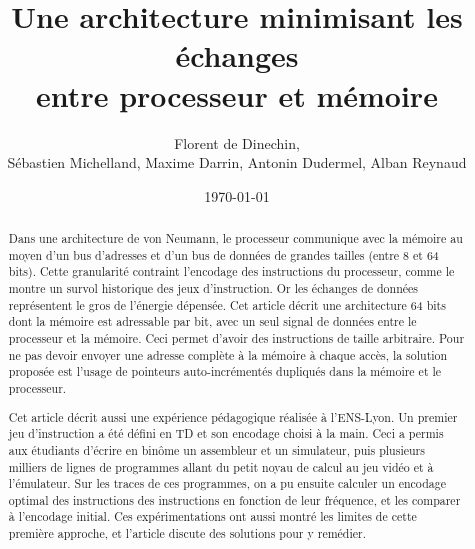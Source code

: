 \documentclass[architecture]{compas2018}
\begin{document}
\title{Une architecture minimisant les échanges\\ entre processeur et mémoire}

\author{Florent de Dinechin, \\Sébastien Michelland, Maxime Darrin, Antonin Dudermel, Alban Reynaud}

\address{
}

\date{\today}

\maketitle
\sloppy

\begin{abstract}
Dans une architecture de von Neumann, le processeur communique avec la mémoire au moyen d'un bus d'adresses et d'un bus de données de grandes tailles (entre 8 et 64 bits).
Cette granularité contraint l'encodage des instructions du processeur, comme le montre un survol historique des jeux d'instruction.
Or les échanges de données représentent le gros de l'énergie dépensée.
Cet article décrit une architecture 64 bits dont la mémoire est adressable par bit, avec un seul signal de données entre le processeur et la mémoire.
Ceci permet d'avoir des instructions de taille arbitraire.
Pour ne pas devoir envoyer une adresse complète à la mémoire à chaque accès, la solution proposée est l'usage de pointeurs auto-incrémentés dupliqués dans la mémoire et le processeur.

Cet article décrit aussi une expérience pédagogique réalisée à l'ENS-Lyon.
Un premier jeu d'instruction a été défini en TD et son encodage choisi à la main.
Ceci a permis aux étudiants d'écrire en binôme un assembleur et un simulateur, puis plusieurs milliers de lignes de programmes allant du petit noyau de calcul au jeu vidéo et à l'émulateur.
Sur les traces de ces programmes, on a pu ensuite calculer un encodage optimal des instructions des instructions en fonction de leur fréquence, et les comparer à l'encodage initial.
 Ces expérimentations ont aussi montré les limites de cette première approche, et l'article discute  des solutions pour y remédier.
\end{abstract}

\end{document}
